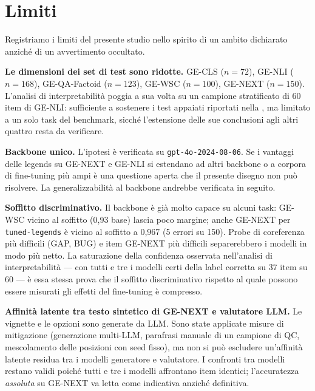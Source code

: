 \documentclass[pdflatex, sn-apa]{sn-jnl}%
\theoremstyle{thmstyleone}%
\theoremstyle{thmstyletwo}%
\theoremstyle{thmstylethree}%
\newcommand{\modellegends}{\texttt{tuned-legends}}
\begin{document}
\FloatBarrier

\section{Limiti}
\label{sec:limitations}

Registriamo i limiti del presente studio nello spirito di un ambito dichiarato
anziché di un avvertimento occultato.

\textbf{Le dimensioni dei set di test sono ridotte.} GE-CLS ($n=72$), GE-NLI
($n=168$), GE-QA-Factoid ($n=123$), GE-WSC ($n=100$), GE-NEXT ($n=150$). L'analisi
di interpretabilità poggia a sua volta su un campione stratificato di 60 item di
GE-NLI: sufficiente a sostenere i test appaiati riportati nella ,
ma limitato a un solo task del benchmark, sicché l'estensione delle sue conclusioni
agli altri quattro resta da verificare.

\textbf{Backbone unico.} L'ipotesi è verificata su \texttt{gpt-4o-2024-08-06}. Se i
vantaggi delle legends su GE-NEXT e GE-NLI si estendano ad altri backbone o a
corpora di fine-tuning più ampi è una questione aperta che il presente disegno non
può risolvere. La generalizzabilità al backbone andrebbe verificata in seguito.

\textbf{Soffitto discriminativo.} Il backbone è già molto capace su alcuni task:
GE-WSC vicino al soffitto (0,93 base) lascia poco margine; anche GE-NEXT per
\modellegends{} è vicino al soffitto a 0,967 (5 errori su 150). Probe di
coreferenza più difficili (GAP, BUG) e item GE-NEXT più difficili separerebbero i
modelli in modo più netto. La saturazione della confidenza osservata nell'analisi
di interpretabilità --- con tutti e tre i modelli certi della label corretta su
$37$ item su $60$ --- è essa stessa prova che il soffitto discriminativo
rispetto al quale
possono essere misurati gli effetti del fine-tuning è compresso.

\textbf{Affinità latente tra testo sintetico di GE-NEXT e valutatore LLM.} Le
vignette e le opzioni sono generate da LLM. Sono state applicate misure di
mitigazione (generazione multi-LLM, parafrasi manuale di un campione di QC,
mescolamento delle posizioni con seed fisso), ma non si può escludere un'affinità
latente residua tra i modelli generatore e valutatore. I confronti tra modelli
restano validi poiché tutti e tre i modelli affrontano item identici;
l'accuratezza \emph{assoluta} su GE-NEXT va letta come indicativa anziché
definitiva.
\end{document}
